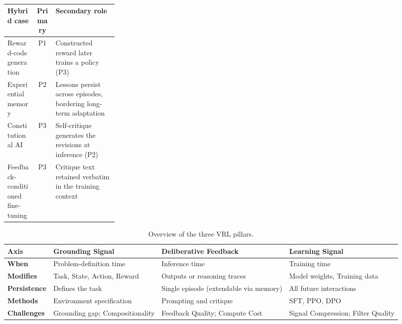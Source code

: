 \begin{table}[ht]
    \centering
    \small
    \renewcommand{\arraystretch}{1.15}
    \caption{}
    \label{tab:hybrid}
    {\ifmarkup\color{red}\fi
    \begin{tabularx}{\linewidth}{@{} >{\raggedright\arraybackslash}p{0.26\linewidth} c >{\raggedright\arraybackslash}X @{}}
        \toprule
        \textbf{Hybrid case} & \textbf{Primary} & \textbf{Secondary role} \\
        \midrule
        Reward-code generation \citep{ma2024eureka} & P1 & Constructed reward later trains a policy (P3) \\
        Experiential memory \citep{shinn2023reflexion} & P2 & Lessons persist across episodes, bordering long-term adaptation \\
        Constitutional AI \citep{bai2022constitutional} & P3 & Self-critique generates the revisions at inference (P2) \\
        Feedback-conditioned fine-tuning \citep{luo2025fcp} & P3 & Critique text retained verbatim in the training context \\
        \bottomrule
    \end{tabularx}}
\end{table}

\begin{table}[ht]
    \centering
    \small
    \renewcommand{\arraystretch}{1.2}
    \caption{Overview of the three VRL pillars.}
    \label{tab:pillar-overview}
    \begin{tabularx}{\linewidth}{@{} l *{3}{>{\raggedright\arraybackslash}X} @{}}
        \toprule
        \textbf{Axis} & \textbf{Grounding Signal} & \textbf{Deliberative Feedback} & \textbf{Learning Signal} \\
        \midrule
        \textbf{When} & Problem-definition time & Inference time & Training time \\
        \midrule
        \textbf{Modifies} & Task, State, Action, Reward & Outputs or reasoning traces & Model weights, Training data \\
        \midrule
        \textbf{Persistence} & Defines the task & Single episode (extendable via memory) & All future interactions \\
        \midrule
        \textbf{Methods} & Environment specification & Prompting and critique & SFT, PPO, DPO \\
        \midrule
        \textbf{Challenges} & Grounding gap; Compositionality & Feedback Quality; Compute Cost & Signal Compression; Filter Quality \\
        \bottomrule
    \end{tabularx}
\end{table}


